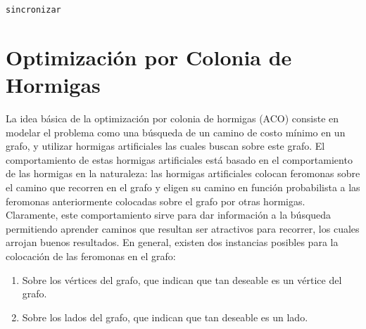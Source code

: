 \documentclass[conference]{IEEEtran}
\begin{document}
\begin{scriptsize}
\LinesNumbered
\begin{algoritmo}[htp]
\label{cdls:sync}

 \caption{\texttt{sincronizar}}
  \DontPrintSemicolon

\end{algoritmo}
\end{scriptsize}


\section{Optimización por Colonia de Hormigas}
\label{sec:aco}

La idea básica de la optimización por colonia de hormigas (ACO)
consiste en modelar el problema como una búsqueda de un camino de
costo mínimo en un grafo, y utilizar hormigas artificiales las cuales
buscan sobre este grafo. El comportamiento de estas hormigas
artificiales está basado en el comportamiento de las hormigas en la
naturaleza: las hormigas artificiales colocan feromonas sobre el
camino que recorren en el grafo y eligen su camino en función
probabilista a las feromonas anteriormente colocadas sobre el grafo
por otras hormigas. Claramente, este comportamiento sirve para dar
información a la búsqueda permitiendo aprender caminos que resultan
ser atractivos para recorrer, los cuales arrojan buenos resultados. En
general, existen dos instancias posibles para la colocación de las
feromonas en el grafo:

\begin{enumerate}
\item Sobre los vértices del grafo, que indican que tan deseable es un
  vértice del grafo.
\item Sobre los lados del grafo, que indican que tan deseable es un
  lado.
\end{enumerate}
\end{document}
